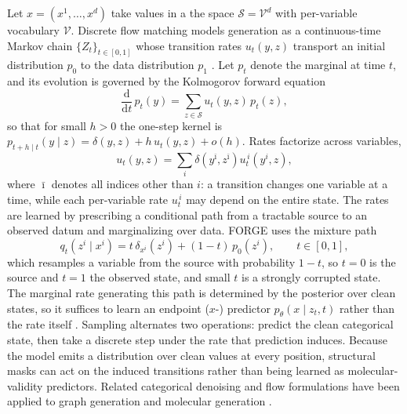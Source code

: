\documentclass{article}
\makeatletter
\def\paragraph{\@startsection{paragraph}{4}{\z@}{0.6ex plus 0.2ex minus .1ex}{-1em}{\normalsize\bf}}
\makeatother
\begin{document}
\paragraph{Discrete flow matching}
\label{sec:dfm}
Let $x = (x^1, \dots, x^d)$ take values in a the space $\mathcal{S} = \mathcal{V}^d$ with
per-variable vocabulary $\mathcal{V}$. Discrete flow matching models generation as a continuous-time
Markov chain $\{Z_t\}_{t \in [0,1]}$ whose transition rates $u_t(y, z)$ transport an initial
distribution $p_0$ to the data distribution $p_1$
\citep{campbell2024generative,gat2024discrete,lipman2024guide}. Let $p_t$ denote the marginal at
time $t$, and its evolution is governed by the Kolmogorov forward equation
%
\begin{equation}
\label{eq:kolmogorov}
\frac{\mathrm{d}}{\mathrm{d}t}\, p_t(y) = \sum_{z \in \mathcal{S}} u_t(y, z)\, p_t(z),
\end{equation}
%
so that for small $h > 0$ the one-step kernel is
$p_{t+h \mid t}(y \mid z) = \delta(y, z) + h\, u_t(y, z) + o(h)$. Rates factorize across variables,
%
\begin{equation}
\label{eq:factorized}
u_t(y, z) = \sum_{i} \delta\!\left(y^{\bar{\imath}}, z^{\bar{\imath}}\right)
u_t^{\,i}\!\left(y^i, z\right),
\end{equation}
%
where $\bar{\imath}$ denotes all indices other than $i$: a transition changes one variable at a time,
while each per-variable rate $u_t^{\,i}$ may depend on the entire state. 
The rates are learned by prescribing a conditional path from a tractable source to an observed datum
and marginalizing over data. FORGE uses the mixture path
%
\begin{equation}
\label{eq:mixture}
q_t\!\left(z^i \mid x^i\right) = t\, \delta_{x^i}\!\left(z^i\right) + (1-t)\, p_0\!\left(z^i\right),
\qquad t \in [0,1],
\end{equation}
%
which resamples a variable from the source with probability $1-t$, so $t = 0$ is the source and
$t = 1$ the observed state, and small $t$ is a strongly corrupted state. The marginal rate generating
this path is determined by the posterior over clean states, so it suffices to learn an endpoint
($x$-) predictor $p_\theta(x \mid z_t, t)$ rather than the rate itself
\citep{campbell2024generative,gat2024discrete}. Sampling alternates two operations: predict the clean
categorical state, then take a discrete step under the rate that prediction induces. Because the
model emits a distribution over clean values at every position, structural masks can act on the
induced transitions rather than being learned as molecular-validity predictors. Related categorical
denoising and flow formulations have been applied to graph generation
\citep{austin2021structured,vignac2023digress,qin2025defog} and molecular generation
\citep{eijkelboom2024variational}.
\end{document}
